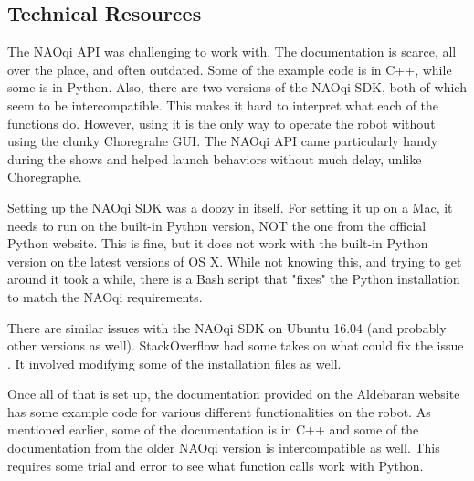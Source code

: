 \subsection{Technical Resources}

    The NAOqi API was challenging to work with. The documentation is scarce, all over the place, and often outdated.
    Some of the example code is in C++, while some is in Python. Also, there are two versions of the NAOqi SDK, both of which seem to be intercompatible.
    This makes it hard to interpret what each of the functions do.
    However, using it is the only way to operate the robot without using the clunky Choregrahe GUI. 
    The NAOqi API came particularly handy during the shows and helped launch behaviors without much delay, unlike Choregraphe.

    Setting up the NAOqi SDK was a doozy in itself. For setting it up on a Mac, it needs to run on the built-in Python version, 
    NOT the one from the official Python website. This is fine, but it does not work with the built-in Python version on the latest versions of OS X.
    While not knowing this, and trying to get around it took a while, there is a Bash script \cite{BashScript}
    that "fixes" the Python installation to match the NAOqi requirements. 

    There are similar issues with the NAOqi SDK on Ubuntu 16.04 (and probably other versions as well). StackOverflow had some takes 
    on what could fix the issue \cite{naoUbuntu}. It involved modifying some of the installation files as well.

    Once all of that is set up, the documentation provided on the Aldebaran website \cite{AldebaranDoc} has some example code for various different functionalities on the robot.
    As mentioned earlier, some of the documentation is in C++ and some of the documentation from the older NAOqi version is intercompatible as well. 
    This requires some trial and error to see what function calls work with Python.

